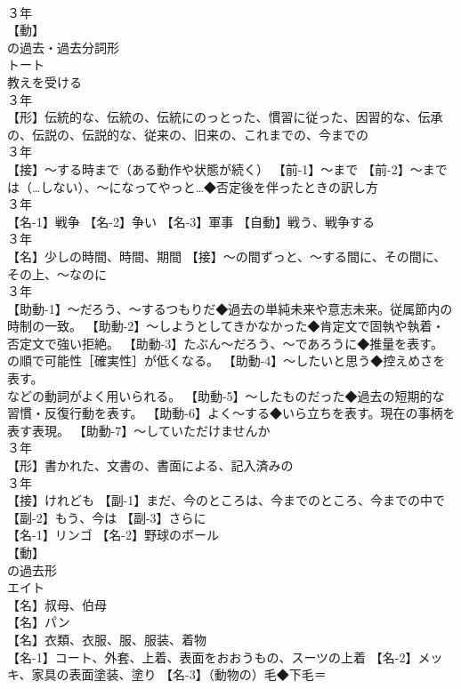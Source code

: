 \documentclass[8pt]{extreport}
\begin{document}
\begin{CJK}{UTF8}{min}
\\	３年	
\\	【動】
\\	の過去・過去分詞形 
\\	トート 
\\	教えを受ける
\\	３年	
\\	【形】伝統的な、伝統の、伝統にのっとった、慣習に従った、因習的な、伝承の、伝説の、伝説的な、従来の、旧来の、これまでの、今までの
\\	３年	
\\	【接】～する時まで（ある動作や状態が続く） 【前-1】～まで 【前-2】～までは（…しない）、～になってやっと…◆否定後を伴ったときの訳し方
\\	３年	
\\	【名-1】戦争 【名-2】争い 【名-3】軍事 【自動】戦う、戦争する
\\	３年	
\\	【名】少しの時間、時間、期間 【接】～の間ずっと、～する間に、その間に、その上、～なのに
\\	３年	
\\	【助動-1】～だろう、～するつもりだ◆過去の単純未来や意志未来。従属節内の時制の一致。 【助動-2】～しようとしてきかなかった◆肯定文で固執や執着・否定文で強い拒絶。 【助動-3】たぶん～だろう、～であろうに◆推量を表す。
\\	の順で可能性［確実性］が低くなる。 【助動-4】～したいと思う◆控えめさを表す。
\\	などの動詞がよく用いられる。 【助動-5】～したものだった◆過去の短期的な習慣・反復行動を表す。 【助動-6】よく～する◆いら立ちを表す。現在の事柄を表す表現。 【助動-7】～していただけませんか
\\	３年	
\\	【形】書かれた、文書の、書面による、記入済みの
\\	３年	
\\	【接】けれども 【副-1】まだ、今のところは、今までのところ、今までの中で 【副-2】もう、今は 【副-3】さらに
\\	【名-1】リンゴ 【名-2】野球のボール
\\	【動】
\\	の過去形 
\\	エイト
\\	【名】叔母、伯母
\\	【名】パン
\\	【名】衣類、衣服、服、服装、着物
\\	【名-1】コート、外套、上着、表面をおおうもの、スーツの上着 【名-2】メッキ、家具の表面塗装、塗り 【名-3】（動物の）毛◆下毛＝

\end{CJK}
\end{document}
